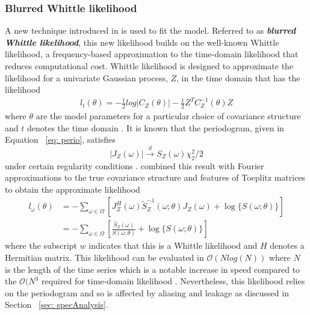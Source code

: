 \documentclass{stat572Style}
\begin{document}
\subsubsection{Blurred Whittle likelihood}
A new technique introduced in  \citet{Sykulski2013}  is used to fit the model. Referred to as \textbf{\it{blurred Whittle likelihood}}, this new likelihood builds on the well-known Whittle likelihood, a frequency-based approximation  to the time-domain likelihood that reduces computational cost.  Whittle likelihood is designed to approximate the likelihood for a univariate Gaussian process, $Z$,  in the time domain that has the likelihood
\begin{align*}
l_{t}(\theta) = - \frac{1}{2} log |C_{Z}(\theta) | - \frac{1}{2} Z^{T} C_{Z}^{-1}(\theta)Z
\end{align*}
where $\theta$ are the model parameters for a particular choice of covariance structure  and $t$ denotes the time domain  \citep{Sykulski2013}.  It is known that  the periodogram, given in Equation ~\ref{eq: perio}, satisfies
\begin{equation}
|J_{Z}(\omega)| \overset{d}{\rightarrow} S_{Z}(\omega) \chi^{2}_{2}/2
\end{equation}
under certain regularity conditions \citep{Contreras2006}. \citet{Whittle1953} combined this result with Fourier approximations to the true covariance structure and features of Toeplitz matrices to obtain the approximate likelihood
\begin{align}
l_{\omega}(\theta) &= - \sum_{\omega \in \Omega} \left[ J_{Z}^{H}(\omega) \tilde{S}_{Z}^{-1}(\omega; \theta) J_{Z}(\omega) + \log \{S(\omega; \theta) \} \right]\\
\label{eq: bwl}
&= -\sum_{\omega \in \Omega} \left[ \frac{\hat{S}_{Z}(\omega)}{S(\omega;\theta)}  + \log  \{ S(\omega; \theta) \}\right]
\end{align}
 where the subscript $w$ indicates that this is a Whittle likelihood and $H$ denotes a Hermitian matrix.  This likelihood can be evaluated in $\mathcal{O}(N log(N))$ where $N$ is the length of the time series which is a notable increase in speed compared to the $\mathcal{O}(N^{3}$  required for time-domain likelihood  \citep{Sykulski2016}. Nevertheless, this likelihood relies on the periodogram and so is affected by aliasing and leakage as discussed in Section ~\ref{sec: specAnalysis}. 
 
\end{document}

